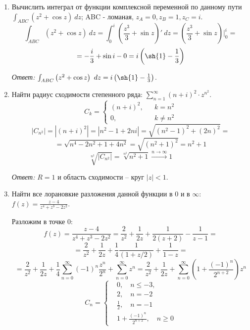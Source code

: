 \documentclass[14pt, a4paper, titlepage, fleqn]{extarticle}
\newcommand{\otv}{\textit{Ответ:} }
\begin{document}
\begin{enumerate}
        \item Вычислить интеграл от функции комплексной переменной по данному пути
        \( \int_{ABC} \left( z^2 + \cos z \right) ~ dz \); ABC - ломаная, 
        \( z_A = 0, z_B = 1, z_C = i \). 
        \[
            \int_{ABC} \left( z^2 + \cos z \right) ~ dz = \int_{0}^{i} \left( \frac{z^3}{3} + \sin z \right)' ~ dz = 
            \left( \frac{z^3}{3} + \sin z \right) \bigg\vert_0^i = 
        \]
        \[
            = -\frac{i}{3} + \sin i - 0 = i \left( \sh{1} -\frac{1}{3} \right)
        \]

        \otv \( \int_{ABC} \left( z^2 + \cos z \right) ~ dz = i \left( \sh{1} -\frac{1}{3} \right) \).

        \item Найти радиус сходимости степенного ряда: \(  \sum_{n=1}^{\infty} \left( n + i \right)^2 \cdot z^{n^2} \).
        \[
            C_k = \left\lbrace
            \begin{matrix}
                (n + i)^2, && k = n^2 \\
                0, && k \neq n^2
            \end{matrix}
            \right.
        \]
        \[
            \left| C_{n^2} \right| = \left| (n+i)^2 \right| = \left| n^2 - 1 + 2ni \right| = \sqrt{ \left( n^2-1 \right)^2 + (2n)^2 } =
        \]
        \[
            = \sqrt{n^4 - 2n^2 + 1 + 4n^2} = \sqrt{ \left( n^2 + 1 \right)^2 } = n^2 + 1
        \]
        \[
            \sqrt[n^2]{\left| C_{n^2} \right|} = \sqrt[n^2]{ n^2 + 1 } \xrightarrow{n\to\infty} 1
        \]

        \otv \( R = 1 \) и область сходимости -- круг \( |z| < 1 \).

        \item Найти все лорановкие разложения данной функции в \( 0 \) и в \( \infty \): \( \displaystyle f(z) = \frac{z-4}{z^4+z^3-2z^2} \).
        
        Разложим в точке \( 0 \):
        \[
            f(z) = \frac{z-4}{z^4+z^3-2z^2} = \frac{2}{z^2} + \frac{1}{2 z} + \frac{1}{2 (z + 2)} - \frac{1}{z - 1} =
        \]
        \[
            = \frac{2}{z^2} + \frac{1}{2 z} + \frac{1}{4} \frac{1}{(1 + z/2)} + \frac{1}{1 - z} =
        \]
        \[
            = \frac{2}{z^2} + \frac{1}{2 z} + \frac{1}{4} \sum_{n=0}^\infty (-1)^n \frac{z^n}{2^n} + \sum_{n=0}^\infty z^n
             = \frac{2}{z^2} + \frac{1}{2 z} + \sum_{n=0}^\infty \left(1 + \frac{(-1)^n}{2^{n+2}} \right) z^n
        \]
        \[
            C_n = \left\lbrace
                \begin{aligned}
                    &0, \quad n \leq -3, \\
                    &2, \quad n = -2 \\
                    &\frac{1}{2}, \quad n = -1 \\
                    &1 + \frac{(-1)^n}{2^{n+2}}, \quad n \geq 0
                \end{aligned}
            \right.
        \]


\end{enumerate}
\end{document}
